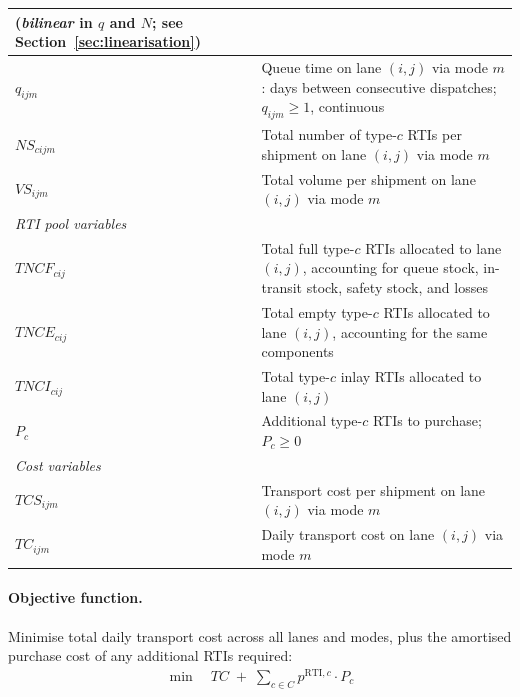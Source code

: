 \begin{longtable}{|p{}|p{}|}
{{    (\emph{bilinear} in $q$ and $N$;
    see Section~\ref{sec:linearisation})}}\\ \hline
$q_{ijm}$
  & Queue time on lane $(i,j)$ via mode $m$: days between
    consecutive dispatches; $q_{ijm} \geq 1$, continuous \\
$NS_{cijm}$
  & Total number of type-$c$ RTIs per shipment on lane $(i,j)$
    via mode $m$ \\
$VS_{ijm}$
  & Total volume per shipment on lane $(i,j)$ via mode $m$ \\
\hline
\multicolumn{2}{|l|}{\textit{RTI pool variables}}\\ \hline
$TNCF_{cij}$
  & Total full type-$c$ RTIs allocated to lane $(i,j)$, accounting
    for queue stock, in-transit stock, safety stock, and losses \\
$TNCE_{cij}$
  & Total empty type-$c$ RTIs allocated to lane $(i,j)$,
    accounting for the same components \\
$TNCI_{cij}$
  & Total type-$c$ inlay RTIs allocated to lane $(i,j)$ \\
$P_{c}$
  & Additional type-$c$ RTIs to purchase; $P_{c} \geq 0$ \\
\hline
\multicolumn{2}{|l|}{\textit{Cost variables}}\\ \hline
$TCS_{ijm}$
  & Transport cost per shipment on lane $(i,j)$ via mode $m$ \\
$TC_{ijm}$
  & Daily transport cost on lane $(i,j)$ via mode $m$ \\
\hline
\end{longtable}






\paragraph{Objective function.}
Minimise total daily transport cost across all lanes and modes,
plus the amortised purchase cost of any additional RTIs required:
%
\begin{align}
  \min \quad
  TC
  \;+\;
  \sum_{c\in C} p^{\text{RTI},c} \cdot P_{c}
  \label{eq:objective}
\end{align}


